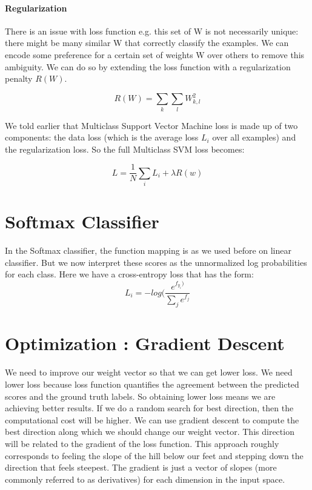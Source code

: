 \paragraph{Regularization}
There is an issue with loss function e.g. this set of W is not necessarily unique: there might be many similar W that correctly classify the examples. We can encode some preference for a certain set of weights W over others to remove this ambiguity. We can do so by extending the loss function with a regularization penalty $R(W)$.

\begin{equation}
R(W)=\sum_{k}\sum_{l}W_{k,l}^2 
\end{equation}

We told earlier that Multiclass Support Vector Machine loss is made up of two components: the data loss (which is the average loss $L_{i}$ over all examples) and the regularization loss. So the full Multiclass SVM loss becomes:

\begin{equation}
L= \dfrac{1}{N}\sum_{i}L_{i}+\lambda R(w)
\end{equation}


\section{Softmax Classifier}
In the Softmax classifier, the function mapping is as we used before on linear classifier. But we now interpret these scores as the unnormalized log probabilities for each class. Here we have a cross-entropy loss that has the form:
\begin{equation}
L_{i}=-log(\dfrac{e^{f_{y_{i}})}}{\sum_{j} e^{f_{j}}}
\end{equation}

\section{Optimization : Gradient Descent}
We need to improve our weight vector so that we can get lower loss. We need lower loss because loss function quantifies the agreement between the predicted scores and the ground truth labels. So obtaining lower loss means we are achieving better results. If we do a random search for best direction, then the computational cost will be higher. We can use gradient descent to compute the best direction along which we should change our weight vector. This direction will be related to the gradient of the loss function. This approach roughly corresponds to feeling the slope of the hill below our feet and stepping down the direction that feels steepest. The gradient is just a vector of slopes (more commonly referred to as derivatives) for each dimension in the input space.\hfill \break

